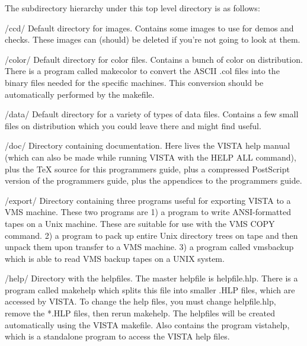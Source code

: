     The subdirectory hierarchy under this top level directory is as follows:
                       
          /ccd/          Default directory for images. Contains some images
                          to use for demos and checks. These images can (should)
                          be deleted if you're not going to look at them.

          /color/         Default directory for color files. Contains a bunch
			  of color on distribution. There is a program called
			  makecolor to convert the ASCII .col files into
			  the binary files needed for the specific machines.
			  This conversion should be automatically performed
			  by the makefile.

          /data/          Default directory for a variety of types of data
                          files. Contains a few small files on distribution
                          which you could leave there and might find useful.

	  /doc/           Directory containing documentation. Here lives the
			  VISTA help manual (which can also be made while
			  running VISTA with the HELP ALL command), plus the
			  TeX source for this programmers guide, plus a
			  compressed PostScript version of the programmers
			  guide, plus the appendices to the programmers guide.

	  /export/	  Directory containing three programs useful for 
			  exporting VISTA to a VMS machine.  These two programs
			  are 1) a program to write ANSI-formatted tapes
			  on a Unix machine.  These are suitable for use with
			  the VMS COPY command.  2) a program to pack up entire
			  Unix directory trees on tape and then unpack them
			  upon transfer to a VMS machine. 3) a program called
			  vmsbackup which is able to read VMS backup tapes
			  on a UNIX system.

          /help/          Directory with the helpfiles. The master helpfile
                          is helpfile.hlp. There is a program called makehelp
                          which splits this file into smaller .HLP files, 
                          which are accessed by VISTA. To change the help files,
                          you must change helpfile.hlp, remove the *.HLP files,
                          then rerun makehelp. The helpfiles will be created
			  automatically using the VISTA makefile.
			  Also contains the program vistahelp, which is a
			  standalone program to access the VISTA help files.


